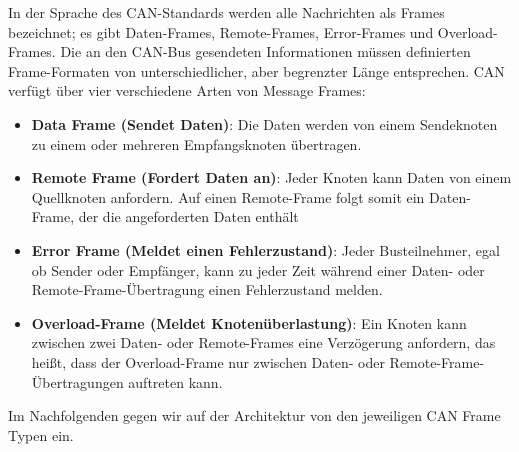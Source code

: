 In der Sprache des CAN-Standards werden alle Nachrichten als Frames bezeichnet; es gibt Daten-Frames, Remote-Frames, Error-Frames und Overload-Frames. Die an den CAN-Bus gesendeten Informationen müssen definierten Frame-Formaten von unterschiedlicher, aber begrenzter Länge entsprechen.
CAN verfügt über vier verschiedene Arten von Message Frames:

\begin{itemize}
	\item \textbf{Data Frame (Sendet Daten)}: Die Daten werden von einem Sendeknoten zu einem oder mehreren Empfangsknoten übertragen.
	\item \textbf{Remote Frame (Fordert Daten an)}: Jeder Knoten kann Daten von einem Quellknoten anfordern. Auf einen Remote-Frame folgt somit ein Daten-Frame, der die angeforderten Daten enthält
	\item \textbf{Error Frame (Meldet einen Fehlerzustand)}: Jeder Busteilnehmer, egal ob Sender oder Empfänger, kann zu jeder Zeit während einer Daten- oder Remote-Frame-Übertragung einen Fehlerzustand melden.
	\item \textbf{Overload-Frame (Meldet Knotenüberlastung)}: Ein Knoten kann zwischen zwei Daten- oder Remote-Frames eine Verzögerung anfordern, das heißt, dass der Overload-Frame nur zwischen Daten- oder Remote-Frame-Übertragungen auftreten kann.
\end{itemize}

Im Nachfolgenden gegen wir auf der Architektur von den jeweiligen CAN Frame Typen ein.

